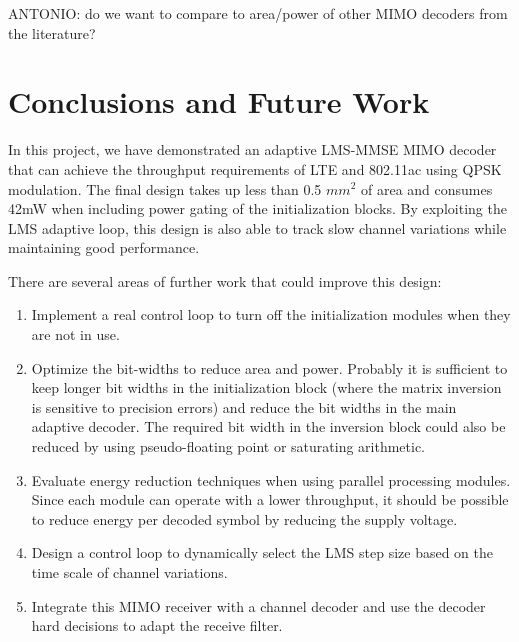\documentclass[journal]{IEEEtran}
\begin{document}
ANTONIO: do we want to compare to area/power of other MIMO decoders from the literature?


\section{Conclusions and Future Work}

In this project, we have demonstrated an adaptive LMS-MMSE MIMO decoder that can achieve the throughput requirements of LTE and 802.11ac using QPSK modulation. The final design takes up less than 0.5 $mm^2$ of area and consumes 42mW when including power gating of the initialization blocks. By exploiting the LMS adaptive loop, this design is also able to track slow channel variations while maintaining good performance.

There are several areas of further work that could improve this design:
\begin{enumerate}
\item Implement a real control loop to turn off the initialization modules when they are not in use.
\item Optimize the bit-widths to reduce area and power. Probably it is sufficient to keep longer bit widths in the initialization block (where the matrix inversion is sensitive to precision errors) and reduce the bit widths in the main adaptive decoder. The required bit width in the inversion block could also be reduced by using pseudo-floating point or saturating arithmetic.
\item Evaluate energy reduction techniques when using parallel processing modules. Since each module can operate with a lower throughput, it should be possible to reduce energy per decoded symbol by reducing the supply voltage.
\item Design a control loop to dynamically select the LMS step size based on the time scale of channel variations.
\item Integrate this MIMO receiver with a channel decoder and use the decoder hard decisions to adapt the receive filter.
\end{enumerate}





\end{document}
